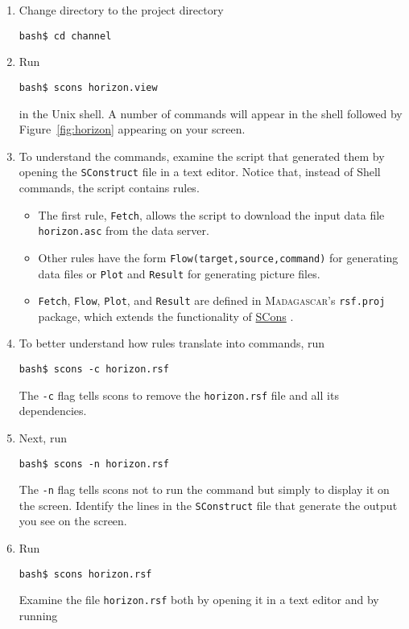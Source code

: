\begin{enumerate}
\item Change directory to the project directory
\begin{verbatim}
bash$ cd channel
\end{verbatim}
\item Run
\begin{verbatim}
bash$ scons horizon.view
\end{verbatim}
in the Unix shell. A number of commands will appear in the shell followed by Figure~\ref{fig:horizon} appearing on your screen. 
\item To understand the commands, examine the script that generated them by opening the \texttt{SConstruct} file in a text editor. Notice that, instead of Shell commands, the script contains rules. 
\begin{itemize}
\item The first rule, \texttt{Fetch}, allows the script to download the input data file \texttt{horizon.asc} from the data server. 
\item Other rules have the form \texttt{Flow(target,source,command)} for generating data files or \texttt{Plot} and  \texttt{Result} for 
generating picture files. 
\item \texttt{Fetch}, \texttt{Flow}, \texttt{Plot}, and \texttt{Result} are defined in \textsc{Madagascar}'s \texttt{rsf.proj} package, which extends the functionality of \href{http://www.scons.org}{SCons}
\cite[]{icassp}.
\end{itemize}
\item To better understand how rules translate into commands, run 
\begin{verbatim}
bash$ scons -c horizon.rsf
\end{verbatim}
The \texttt{-c} flag tells scons to remove the \texttt{horizon.rsf} file and all its dependencies.
\item Next, run
\begin{verbatim}
bash$ scons -n horizon.rsf
\end{verbatim}
The \texttt{-n} flag tells scons not to run the command but simply to display it on the screen. Identify the lines in the \texttt{SConstruct} file that generate the output you see on the screen.
\item Run
\begin{verbatim}
bash$ scons horizon.rsf
\end{verbatim}
Examine the file \texttt{horizon.rsf} both by opening it in a text editor and by running
\begin{verbatim}

\end{verbatim}
\end{enumerate}
